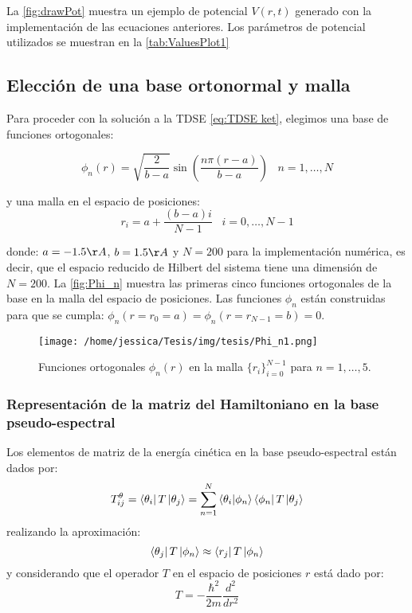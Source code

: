 La \autoref{fig:drawPot} muestra un ejemplo de potencial $V(r,t)$ generado con la implementación de las ecuaciones anteriores. Los parámetros de potencial utilizados se muestran en la \autoref{tab:ValuesPlot1}

\subsection{Elección de una base ortonormal y malla}

Para proceder con la solución a la \acs{TDSE} \autoref{eq:TDSE ket}, elegimos una base de funciones ortogonales: \cite{Colbert1992}

\begin{equation}
  \label{eq:eigenfunc}
  \phi_n(r)=\sqrt{\frac{2}{b-a}}\sin\left( \frac{n\pi(r-a)}{b-a}\right) \,\,\,\,\, n=1,\dots,N
\end{equation}

y una malla en el espacio de posiciones:
\begin{equation}
  \label{eq:grid}
  r_i = a + \frac{(b-a)i}{N-1} \,\,\,\,\, i=0,\dots,N-1
\end{equation}

donde: $a=-1.5\AA$, $b=1.5\AA$ y $N=200$ para la implementación numérica, es decir, que el espacio reducido de Hilbert del sistema tiene una dimensión de $N=200$. La \autoref{fig:Phi_n} muestra las primeras cinco funciones ortogonales de la base en la malla del espacio de posiciones. Las funciones $\phi_n$ están construidas para que se cumpla: $\phi_n(r=r_0=a)=\phi_n(r=r_{N-1}=b)=0$.

\begin{figure}[ht]
  \centering
  \texttt{[image: /home/jessica/Tesis/img/tesis/Phi\_n1.png]}
  \caption{Funciones ortogonales $\phi_n(r)$ en la malla $\{r_i\}_{i=0}^{N-1}$ para $n=1,\dots,5$.}
  \label{fig:Phi_n}
\end{figure}

\subsubsection{Representación de la matriz del Hamiltoniano en la base pseudo-espectral}

Los elementos de matriz de la energía cinética en la base pseudo-espectral están dados por:
\begin{equation}
  \label{eq:T}
T^{\theta}_{ij}= \bra{\theta_i}T\ket{\theta_j}=\sum_{n=1}^N\bra{\theta_i}\ket{\phi_n}\bra{\phi_n}T\ket{\theta_j}
\end{equation}
realizando la aproximación:
$$\bra{\theta_j}T\ket{\phi_n} \approx \bra{r_j}T\ket{\phi_n}$$
y considerando que el operador $T$ en el espacio de posiciones $r$ está dado por:
\begin{equation}
  \label{eq:Toperator}
  T = -\frac{\hbar^2}{2m}\frac{d^2}{dr^2}
\end{equation}


